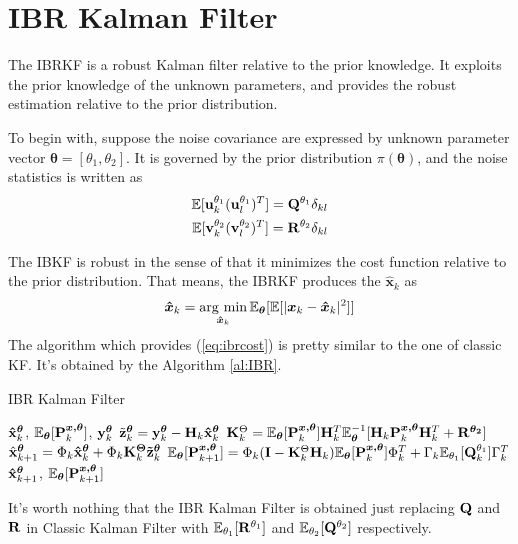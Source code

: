 \section{IBR Kalman Filter\label{sec: ibr}}

The IBRKF is a robust Kalman filter relative to the prior knowledge. It exploits the prior knowledge of the unknown parameters, and provides the robust estimation relative to the prior distribution. 

To begin with, suppose the noise covariance are expressed by unknown parameter vector $\bm{\theta}=[\theta_1, \theta_2]$. It is governed by the prior distribution $\pi(\bm{\theta})$, and the noise statistics is written as
\begin{align}
    \mathbb{E}[{\bf u}^{\theta_1}_k ({\bf u}^{\theta_1}_l)^T]={\bf Q}^{\theta_1}\delta_{kl} \\
    \mathbb{E}[{\bf v}^{\theta_2}_k ({\bf v}^{\theta_2}_l)^T]={\bf R}^{\theta_2}\delta_{kl} 
\end{align}

The IBKF is robust in the sense of that it minimizes the cost function relative to the prior distribution. That means, the IBRKF produces the $\bm{\hat x}_k$ as
\begin{equation} \label{eq:ibrcost}
    \bm{\hat x}_k = \mathop{\rm arg~min}\limits_{\bm{\hat x}_k}\mathbb{E}_{\bm{\theta}}[\mathbb{E}[|\bm{x}_k-\bm{\hat x}_k|^2]]
\end{equation}
The algorithm which provides (\ref{eq:ibrcost}) is pretty similar to the one of classic KF. It's obtained by the Algorithm \ref{al:IBR}.

\begin{algorithm}[]
\caption{IBR Kalman Filter}
\begin{algorithmic}[1]
    \label{al:IBR}
\REQUIRE ${\bf \hat x}^{\bm{\theta}}_k$, $\mathbb{E}_{\bm{\theta}}[{\bf P}^{\bm{x, \theta}}_{k}]$, ${\bf y}^{\bm{\theta}}_k$
\STATE $\tilde {\bf z}^{\bm{\theta}}_k = {\bf y}^{\bm{\theta}}_k - {\bf H}_k{\bf \hat x}^{\bm{\theta}}_k$
\STATE ${\bf K}^{\Theta}_k = \mathbb{E}_{\bm{\theta}}[{\bf P}^{\bm{x, \theta}}_k]{\bf H}^T_k\mathbb{E}_{\bm{\theta}}^{-1}[{\bf H}_k{\bf P}^{\bm{x, \theta}}_k{\bf H}^T_k+{\bf R}^{\bm{\theta_2}}]$
\STATE $\hat{\bf x}^{\bm{\theta}}_{k+1} = {\Phi}_k{\bf \hat x}^{\bm{\theta}}_k+{\Phi}_k{\bf K}^{\bm{\Theta}}_k{\bf \tilde z}^{\bm{\theta}}_k$
\STATE $\mathbb{E}_{\bm\theta}[{\bf P}^{\bm{x, \theta}}_{k+1}] = {\Phi}_k({\bf I}-{\bf K}^{\Theta}_k{\bf H}_k)\mathbb{E}_{\bm\theta}[{\bf P}^{\bm{x, \theta}}_k]{\Phi}^T_k + {\Gamma}_k\mathbb{E}_{\theta_1}[{\bf Q}^{\theta_1}_k]{\Gamma}_k^T$
\ENSURE ${\bf \hat x}^{\bm{\theta}}_{k+1}$, $\mathbb{E}_{\bm\theta}[{\bf P}^{\bm{x, \theta}}_{k+1}]$
\end{algorithmic}
\end{algorithm}

It's worth nothing that the IBR Kalman Filter is obtained just replacing ${\bf Q}$ and ${\bf R}$ in Classic Kalman Filter with $\mathbb{E}_{\theta_1}[{\bf R}^{\theta_1}]$ and $\mathbb{E}_{\theta_2}[{\bf Q}^{\theta_2}]$ respectively.